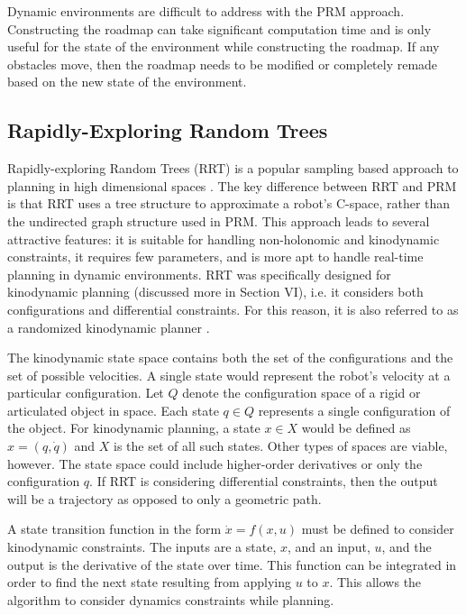 \documentclass[10pt,conference]{ieeeconf}
\begin{document}
Dynamic environments are difficult to address with the PRM approach. Constructing the roadmap can take significant computation time and is only useful for the state of the environment while constructing the roadmap. If any obstacles move, then the roadmap needs to be modified or completely remade based on the new state of the environment.


\subsection{Rapidly-Exploring Random Trees}

Rapidly-exploring Random Trees (RRT) is a popular sampling based approach to planning in high dimensional spaces \cite{RRT}. The key difference between RRT and PRM is that RRT uses a tree structure to approximate a robot's C-space, rather than the undirected graph structure used in PRM. This approach leads to several attractive features: it is suitable for handling non-holonomic and kinodynamic constraints, it requires few parameters, and is more apt to handle real-time planning in dynamic environments. RRT was specifically designed for kinodynamic planning (discussed more in Section VI), i.e. it considers both configurations and differential constraints. For this reason, it is also referred to as a randomized kinodynamic planner \cite{lavalle2001randomized}.  

The kinodynamic state space contains both the set of the configurations and the set of possible velocities. A single state would represent the robot's velocity at a particular configuration. Let $Q$ denote the configuration space of a rigid or articulated object in space. Each state $q \in Q$ represents a single configuration of the object. For kinodynamic planning, a state $x \in X$ would be defined as $x=(q,\dot{q})$ and $X$ is the set of all such states. Other types of spaces are viable, however. The state space could include higher-order derivatives or only the configuration $q$. If RRT is considering differential constraints, then the output will be a trajectory as opposed to only a geometric path.

A state transition function in the form $\dot{x} = f(x,u)$ must be defined to consider kinodynamic constraints. The inputs are a state, $x$, and an input, $u$, and the output is the derivative of the state over time. This function can be integrated in order to find the next state resulting from applying $u$ to $x$. This allows the algorithm to consider dynamics constraints while planning. 
\end{document}
